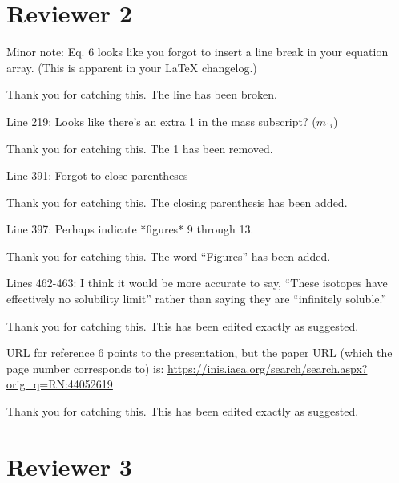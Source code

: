 \documentclass[answers,12pt]{exam}
\begin{document}
\section*{Reviewer 2}
\begin{questions}
\question Minor note: Eq. 6 looks like you forgot to insert a line break in your equation array. (This is apparent in your LaTeX changelog.)
\begin{solution}
        Thank you for catching this. The line has been broken. 
\end{solution}

\question Line 219: Looks like there's an extra 1 in the mass subscript? 
($m_{1i}$)
\begin{solution}
        Thank you for catching this. The 1 has been removed.
\end{solution}

\question Line 391: Forgot to close parentheses
\begin{solution}
        Thank you for catching this. The closing parenthesis has been added.
\end{solution}

\question Line 397: Perhaps indicate *figures* 9 through 13.
\begin{solution}
        Thank you for catching this. The word ``Figures'' has been added.
\end{solution}

\question Lines 462-463: I think it would be more accurate to say, ``These 
isotopes have effectively no solubility limit'' rather than saying they are 
``infinitely soluble.''

\begin{solution}
        Thank you for catching this. This has been edited exactly as suggested. 
\end{solution}

\question URL for reference 6 points to the presentation, but the paper URL 
(which the page number corresponds to) is: 
\url{https://inis.iaea.org/search/search.aspx?orig_q=RN:44052619}
\begin{solution}
        Thank you for catching this. This has been edited exactly as suggested. 
\end{solution}



\section*{Reviewer 3}


\end{questions}
\end{document}
